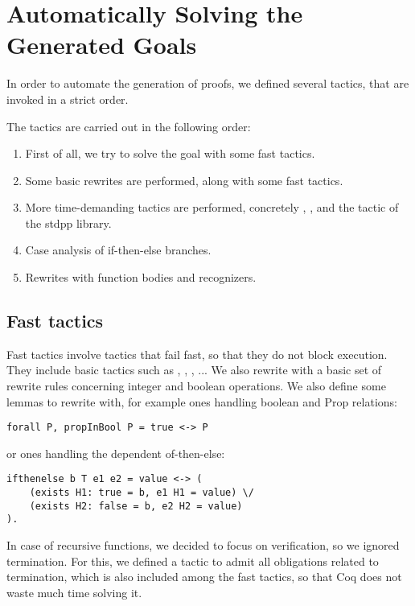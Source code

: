 \section{Automatically Solving the Generated Goals}

In order to automate the generation of proofs, we defined several tactics, that are invoked in a strict order.

The tactics are carried out in the following order:

\begin{enumerate}
	\item First of all, we try to solve the goal with some fast tactics.
	\item Some basic rewrites are performed, along with some fast tactics.
	\item More time-demanding tactics are performed, concretely , ,  and the  tactic of the stdpp library.
	\item Case analysis of if-then-else branches.
	\item Rewrites with function bodies and recognizers.
\end{enumerate}

\subsection{Fast tactics}

Fast tactics involve tactics that fail fast, so that they do not block execution. They include basic tactics such as , , , ...
We also rewrite with a basic set of rewrite rules concerning integer and boolean operations. We also define some lemmas to rewrite with, for example ones handling boolean and Prop relations:

\begin{lstlisting}[style=myCoqstyle]
	forall P, propInBool P = true <-> P
\end{lstlisting}

or ones handling the dependent of-then-else:


\begin{lstlisting}[style=myCoqstyle]
ifthenelse b T e1 e2 = value <-> (
	(exists H1: true = b, e1 H1 = value) \/
	(exists H2: false = b, e2 H2 = value)
).
\end{lstlisting}

In case of recursive functions, we decided to focus on verification, so we ignored termination. For this, we defined a tactic to admit all obligations related to termination, which is also included among the fast tactics, so that Coq does not waste much time solving it.

